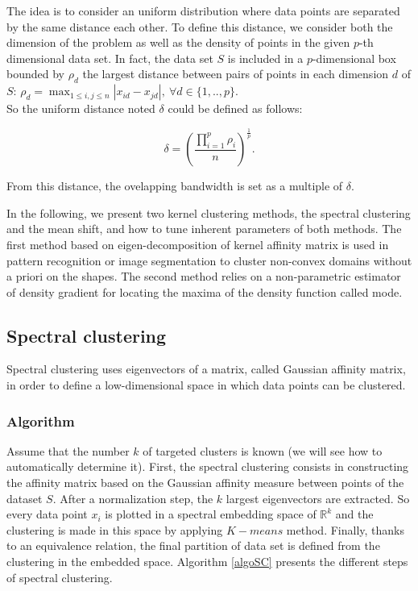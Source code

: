 \documentclass{llncs}
\begin{document}
The idea is to consider an uniform distribution where data points are
separated by the same distance each other. To define this distance, we
consider both the dimension of the problem as well as the density of points in
the given $p$-th dimensional data set.  In fact, the data set $S$ is included
in a $p$-dimensional box bounded by $\rho_d$ the largest distance between
pairs of points in each dimension $d$ of $S$: 
$ \rho_d=\max_{1\leq i,j \leq n}  |x_{id} - x_{jd}|,\ \forall d\in \{1,..,p\}$. \\ So the uniform distance  noted $\delta$ could be defined as follows:

\begin{equation}
  \delta = \left(\frac{\prod_{i=1}^p{\rho_i}}{n}\right)^{\frac{1}{p}}. \label{delta}
\end{equation}

\noindent From this distance, the ovelapping bandwidth is set as a multiple of $\delta$.

In the following, we present two kernel clustering methods, the spectral
clustering and  the mean shift, and how to tune inherent parameters of both
methods.  The first method based on eigen-decomposition of kernel affinity
matrix is used in pattern recognition or image segmentation  to cluster
non-convex domains without a priori on the shapes. The second method relies on
a non-parametric estimator of density gradient for locating the maxima of the
density function called mode.

\subsection{Spectral clustering}

Spectral clustering uses eigenvectors of a matrix, called Gaussian affinity
matrix, in order to define a low-dimensional space in which data points can be
clustered.

\subsubsection{Algorithm}

Assume that the number $k$ of targeted clusters is known (we will see how to automatically determine it). First, the spectral
clustering consists in constructing the affinity matrix based on the Gaussian
affinity measure between points of the dataset $S$.  After a normalization
step, the $k$ largest eigenvectors are extracted. So every data point $x_i$ is
plotted in a spectral embedding space of $\mathbb{R}^k$ and the clustering is
made in this space by applying $K-means$ method. Finally, thanks to an
equivalence relation, the final partition of data set is defined from the
clustering in the embedded space. Algorithm \ref{algoSC} presents the
different steps of spectral clustering.
\end{document}
